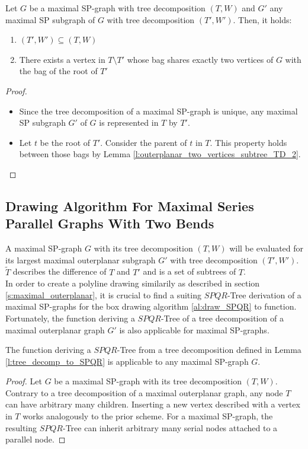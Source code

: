 \begin{lemma}
	Let $G$ be a maximal SP-graph with tree decomposition $(T,W)$ and $G'$ any maximal SP subgraph of $G$ with tree decomposition $(T',W')$. Then, it holds:
	\begin{enumerate}
		\item $(T',W') \subseteq (T,W)$
		\item There exists a vertex in $T\setminus T'$ whose bag shares exactly two vertices of $G$ with the bag of the root of $T'$
	\end{enumerate}
\end{lemma}	
\begin{proof}
	\begin{itemize}
		\item Since the tree decomposition of a maximal SP-graph is unique, any maximal SP subgraph $G'$ of $G$ is represented in $T$ by $T'$.
		\item Let $t$ be the root of $T'$. Consider the parent of $t$ in $T$. This property holds between those bags by Lemma \ref{l:outerplanar_two_vertices_subtree_TD_2}.
	\end{itemize}
\end{proof}


\subsection{Drawing Algorithm For Maximal Series Parallel Graphs With Two Bends}

A maximal SP-graph $G$ with its tree decomposition $(T,W)$ will be evaluated for its largest maximal outerplanar subgraph $G'$ with tree decomposition $(T',W')$. $\tilde{T}$ describes the difference of $T$ and $T'$ and is a set of subtrees of $T$.\\
In order to create a polyline drawing similarily as described in section \ref{s:maximal_outerplanar}, it is crucial to find a suiting $SPQR$-Tree derivation of a maximal SP-graphs for the box drawing algorithm \ref{al:draw_SPQR} to function. Fortunately, the function deriving a $SPQR$-Tree of a tree decomposition of a maximal outerplanar graph $G'$ is also applicable for maximal SP-graphs.
\begin{lemma}
	The function deriving a $SPQR$-Tree from a tree decomposition defined in Lemma \ref{l:tree_decomp_to_SPQR} is applicable to any maximal SP-graph $G$.
\end{lemma}
\begin{proof}
	Let $G$ be a maximal SP-graph with its tree decomposition $(T,W)$. Contrary to a tree decomposition of a maximal outerplanar graph, any node $T$ can have arbitrary many children. Inserting a new vertex described with a vertex in $T$ works analogously to the prior scheme. For a maximal SP-graph, the resulting $SPQR$-Tree can inherit arbitrary many serial nodes attached to a parallel node.
\end{proof}

